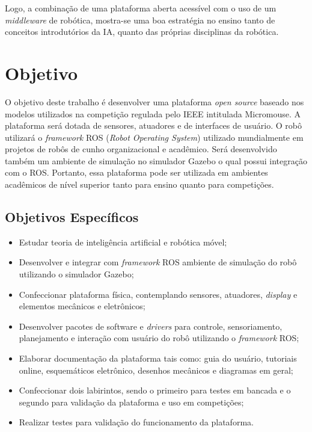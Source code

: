 Logo, a combinação de uma plataforma aberta acessível com o uso de um \textit{middleware} de robótica, mostra-se uma boa estratégia no ensino tanto de conceitos introdutórios da IA, quanto das próprias disciplinas da robótica.


\section{Objetivo}
\label{sec:objetivo_geral}
O objetivo deste trabalho é desenvolver uma plataforma \textit{open source} baseado nos modelos utilizados na competição regulada pelo IEEE intitulada Micromouse. A plataforma será dotada de sensores, atuadores e de interfaces de usuário. O robô utilizará o \textit{framework} ROS (\textit{Robot Operating System}) utilizado mundialmente em projetos de robôs de cunho organizacional e acadêmico. Será desenvolvido também um ambiente de simulação no simulador Gazebo o qual possui integração com o ROS. Portanto, essa plataforma pode ser utilizada em ambientes acadêmicos de nível superior tanto para ensino quanto para competições.

\subsection{Objetivos Específicos}
\label{ssec:objesp}
\begin{itemize}
	\item Estudar teoria de inteligência artificial e robótica móvel;
	\item Desenvolver e integrar com \textit{framework} ROS ambiente de simulação do robô utilizando o simulador Gazebo;
	\item Confeccionar plataforma física, contemplando sensores, atuadores, \textit{display} e elementos mecânicos e eletrônicos;
	\item Desenvolver pacotes de software e \textit{drivers} para controle, sensoriamento, planejamento e interação com usuário do robô utilizando o \textit{framework} ROS;
	\item Elaborar documentação da plataforma tais como: guia do usuário, tutoriais online, esquemáticos eletrônico, desenhos mecânicos e diagramas em geral;
	\item Confeccionar dois labirintos, sendo o primeiro para testes em bancada e o segundo para validação da plataforma e uso em competições;
	\item Realizar testes para validação do funcionamento da plataforma. 
	
\end{itemize}

